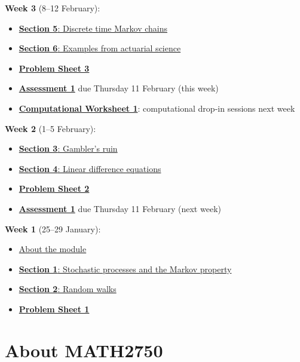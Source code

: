 \documentclass[
  a4paper,
]{article}
\providecommand{\tightlist}{%
  \setlength{\itemsep}{0pt}\setlength{\parskip}{0pt}}
\theoremstyle{definition}
\theoremstyle{definition}
\theoremstyle{definition}
\theoremstyle{remark}
\begin{document}
\textbf{Week 3} (8--12 February):

\begin{itemize}
\tightlist
\item
  \protect\hyperlink{S05-markov-chains}{\textbf{Section 5}: Discrete time Markov chains}
\item
  \protect\hyperlink{S06-examples}{\textbf{Section 6}: Examples from actuarial science}
\item
  \protect\hyperlink{P03}{\textbf{Problem Sheet 3}}
\item
  \protect\hyperlink{A1}{\textbf{Assessment 1}} due Thursday 11 February (this week)
\item
  \protect\hyperlink{computing}{\textbf{Computational Worksheet 1}}: computational drop-in sessions next week
\end{itemize}

\textbf{Week 2} (1--5 February):

\begin{itemize}
\tightlist
\item
  \protect\hyperlink{S03-gamblers-ruin}{\textbf{Section 3}: Gambler's ruin}
\item
  \protect\hyperlink{S04-ldes}{\textbf{Section 4}: Linear difference equations}
\item
  \protect\hyperlink{P02}{\textbf{Problem Sheet 2}}
\item
  \protect\hyperlink{A1}{\textbf{Assessment 1}} due Thursday 11 February (next week)
\end{itemize}

\textbf{Week 1} (25--29 January):

\begin{itemize}
\tightlist
\item
  \protect\hyperlink{S00-about}{About the module}
\item
  \protect\hyperlink{S01-stochastic-processes}{\textbf{Section 1}: Stochastic processes and the Markov property}
\item
  \protect\hyperlink{S02-random-walk}{\textbf{Section 2}: Random walks}
\item
  \protect\hyperlink{P01}{\textbf{Problem Sheet 1}}
\end{itemize}

\hypertarget{S00-about}{%
\section*{About MATH2750}\label{S00-about}}
\end{document}
